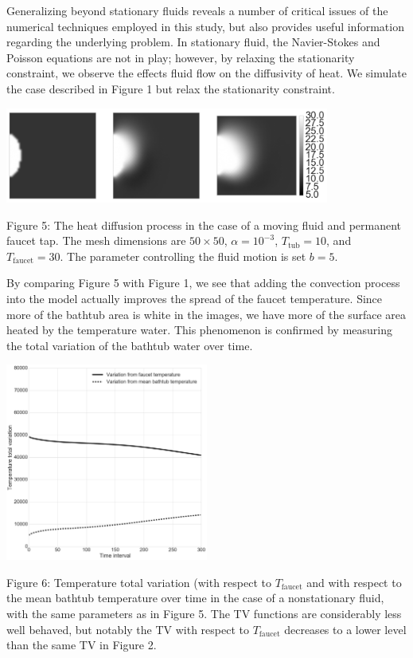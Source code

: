 \documentclass[12pt]{amsart}
\begin{document}
Generalizing beyond stationary fluids reveals a number of critical issues of the
numerical techniques employed in this study, but also provides useful
information regarding the underlying problem. In stationary fluid, the
Navier-Stokes and Poisson equations are not in play; however, by relaxing the
stationarity constraint, we observe the effects fluid flow on the diffusivity of
heat. We simulate the case described in Figure 1 but relax the stationarity constraint.

\begin{center}
    \includegraphics[width=0.8\textwidth]{../plots/diffusion-03.png}

    \justify
    \footnotesize{
    Figure 5: The heat diffusion process in the case of a moving fluid and
    permanent faucet tap. The mesh dimensions are $50 \times 50$, $\alpha =
    10^{-3}$, $T_{\mathrm{tub}} = 10$, and $T_{\mathrm{faucet}} = 30$. The
parameter controlling the fluid motion is set $b = 5$.}
\end{center}

By comparing Figure 5 with Figure 1, we see that adding the convection process
into the model actually improves the spread of the faucet temperature. Since
more of the bathtub area is white in the images, we have more of the surface
area heated by the temperature water. This phenomenon is confirmed by measuring
the total variation of the bathtub water over time.

\begin{center}
    \includegraphics[width=0.5\textwidth]{../plots/tv-03.png}

    \justify
    \footnotesize{
    Figure 6: Temperature total variation (with respect to $T_{\mathrm{faucet}}$
    and with respect to the mean bathtub temperature over time in the case of a
    nonstationary fluid, with the same parameters as in Figure 5. The TV
    functions are considerably less well behaved, but notably the TV with
    respect to $T_{\mathrm{faucet}}$ decreases to a lower level than the same TV
in Figure 2.}
\end{center}
\end{document}
